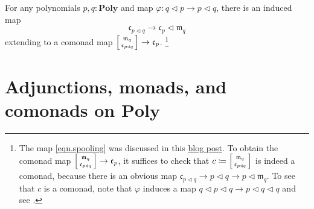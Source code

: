\documentclass[11pt, one side, article]{memoir}
\makeatletter
\theoremstyle{definition}
\theoremstyle{plain}
\newcommand{\Cat}[1]{\mathbf{#1}}%
\newcommand{\yon}{{\mathcal{y}}}
\newcommand{\poly}{\Cat{Poly}}
\newcommand{\0}{\textsf{0}}
\newcommand{\1}{\tn{\textsf{1}}}
\newcommand{\tri}{\mathbin{\triangleleft}}
\newcommand{\at}[2]{\left[#1\mathbin{/}#2\right]}
\newcommand{\cofree}{\mathfrak{c}}
\newcommand{\free}{\mathfrak{m}}
\newcommand{\biglens}[2]{
     \begin{bmatrix}{\vphantom{f_f^f}#2} \\ {\vphantom{f_f^f}#1} \end{bmatrix}
}
\newcommand{\littlelens}[2]{
     \begin{bsmallmatrix}{\vphantom{f}#2} \\ {\vphantom{f}#1} \end{bsmallmatrix}
}
\newcommand{\lens}[2]{
  \relax\if@display
     \biglens{#1}{#2}
  \else
     \littlelens{#1}{#2}
  \fi
}
\makeatother
\begin{document}

For any polynomials $p,q:\poly$ and map $\varphi\colon q\tri p\to p\tri q$, there is an induced map
\begin{equation}\label{eqn.spooling}
	\cofree_{p\tri q}\to\cofree_p\tri\free_q
\end{equation}
extending to a comonad map $\lens{\cofree_{p\tri q}}{\free_q}\to\cofree_p$.%
\footnote{The map \eqref{eqn.spooling} was discussed in this \href{https://topos.institute/blog/2023-04-24-spooling-syntax-from-behavior/}{blog post}. To obtain the comonad map $\lens{\cofree_{p\tri q}}{\free_q}\to\cofree_p$, it suffices to check that $c\coloneqq\lens{\cofree_{p\tri q}}{\free_q}$ is indeed a comonad, because there is an obvious map $\cofree_{p\tri q}\to p\tri q\to p\tri\free_q$. To see that $c$ is a comonad, note that $\varphi$ induces a map $q\tri p\tri q\to p\tri q\tri q$ and see \cite[Example 5.11]{spivak2025categories}.}

\chapter{Adjunctions, monads, and comonads on $\poly$}\label{chap.adj_mon_com}
\end{document}
